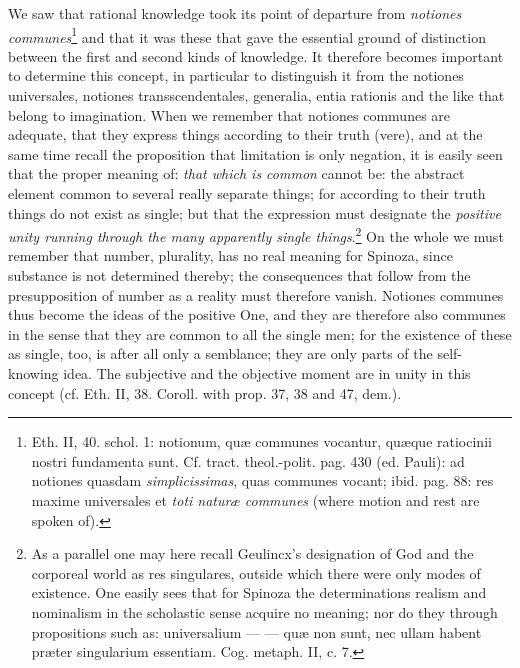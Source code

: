 \documentclass[12pt,a4paper,openany]{book}
\newcommand{\opage}[1]{\marginnote{\footnotesize\textit{[#1]}}}
\begin{document}
We saw that rational knowledge took its point of departure from
\emph{notiones communes}\footnote{Eth. II, 40. schol. 1: notionum, quæ
communes vocantur, quæque ratiocinii nostri fundamenta sunt. Cf.
tract. theol.-polit. pag. 430 (ed. Pauli): ad notiones quasdam
\emph{simplicissimas}, quas communes vocant; ibid. pag. 88: res maxime
universales et \emph{toti naturæ communes} (where motion and
rest are spoken of).} and that it was these
\opage{97}\setcounter{footnote}{0}that gave the essential ground of distinction between the first and second
kinds of knowledge. It therefore becomes important to determine this
concept, in particular to distinguish it from the notiones universales,
notiones transscendentales, generalia, entia
rationis and the like that belong to imagination. When we remember that notiones communes are
adequate, that they express things according to their truth (vere), and
at the same time recall the proposition that limitation is only negation, it is easily
seen that the proper meaning of: \emph{that which is common}
cannot be: the abstract element common to several really separate
things; for according to their truth things do not exist as single;
but that the expression must designate the \emph{positive unity running through
the many apparently single
things}.\footnote{As a parallel one may here recall Geulincx's
designation of God and the corporeal world as res singulares, outside
which there were only modes of existence. One easily sees that for Spinoza
the determinations realism and nominalism in the scholastic sense
acquire no meaning; nor do they through propositions such as: universalium
--- --- quæ non sunt, nec ullam habent præter singularium essentiam.
Cog. metaph. II, c. 7.} On the whole we must remember that number,
plurality, has no real meaning for Spinoza, since
substance is not determined thereby; the consequences that follow from
the presupposition of number as a reality must therefore vanish.
Notiones communes thus become the ideas of the positive One, and they
are therefore also communes in the sense that they are common to all
the single men; for the existence of these as single, too, is after all
only a semblance; they are only parts of the self-knowing idea. The
subjective and the objective moment are in unity in this concept (cf.
Eth. II, 38. Coroll. with prop. 37, 38 and 47, dem.).
\end{document}
